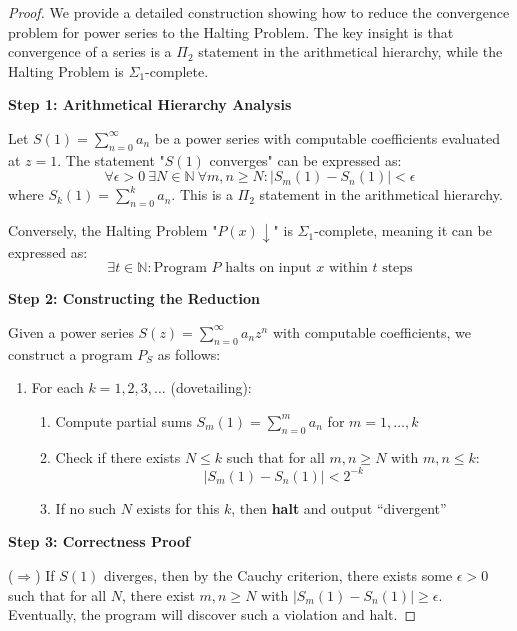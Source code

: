 \documentclass[12pt, a4paper]{article}
\begin{document}
\begin{proof} \cite {rogers1967,weihrauch2000computable}
We provide a detailed construction showing how to reduce the convergence problem for power series to the Halting Problem. The key insight is that convergence of a series is a $\Pi_2$ statement in the arithmetical hierarchy, while the Halting Problem is $\Sigma_1$-complete.

\vspace{0.5em}
\noindent\textbf{Step 1: Arithmetical Hierarchy Analysis}

Let $S(1) = \sum_{n=0}^\infty a_n$ be a power series with computable coefficients evaluated at $z=1$. The statement "$S(1)$ converges" can be expressed as:
\[
\forall \epsilon > 0\ \exists N \in \mathbb{N}\ \forall m,n \geq N: |S_m(1) - S_n(1)| < \epsilon
\]
where $S_k(1) = \sum_{n=0}^k a_n$. This is a $\Pi_2$ statement in the arithmetical hierarchy.

Conversely, the Halting Problem "$P(x)\downarrow$" is $\Sigma_1$-complete, meaning it can be expressed as:
\[
\exists t \in \mathbb{N}: \text{Program } P \text{ halts on input } x \text{ within } t \text{ steps}
\]

\vspace{0.5em}
\noindent\textbf{Step 2: Constructing the Reduction}

Given a power series $S(z) = \sum_{n=0}^\infty a_n z^n$ with computable coefficients, we construct a program $P_S$ as follows:

\begin{enumerate}
\item For each $k = 1, 2, 3, \ldots$ (dovetailing):
\begin{enumerate}
\item Compute partial sums $S_m(1) = \sum_{n=0}^m a_n$ for $m = 1, \ldots, k$
\item Check if there exists $N \leq k$ such that for all $m,n \geq N$ with $m,n \leq k$:
\[
|S_m(1) - S_n(1)| < 2^{-k}
\]
\item If no such $N$ exists for this $k$, then \textbf{halt} and output ``divergent''
\end{enumerate}
\end{enumerate}

\vspace{0.5em}
\noindent\textbf{Step 3: Correctness Proof}

($\Rightarrow$) If $S(1)$ diverges, then by the Cauchy criterion, there exists some $\epsilon > 0$ such that for all $N$, there exist $m,n \geq N$ with $|S_m(1) - S_n(1)| \geq \epsilon$. Eventually, the program will discover such a violation and halt.


\end{proof}
\end{document}
